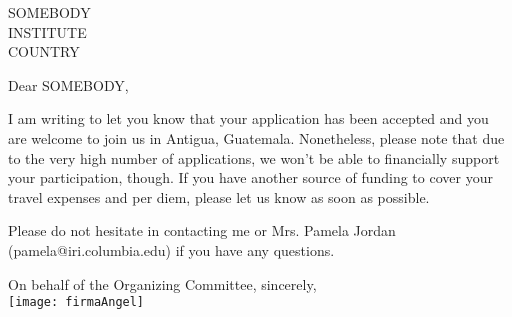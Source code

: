\documentclass[
  fontsize=12pt,
  paper=a4,
   headsepline=false,
  footsepline=true,
  parskip=full, %
  firsthead=true, %
  enlargefirstpage=on,    %
  fromalign=right,        %
  fromphone=off,           %
  fromrule=false, %
  fromemail=true,           %
  addrfield=true,           %
  backaddress=true,         %
  addrfield=true,
  backaddress=false, %
  subject=beforeopening,
  subject=left,
  subject=titled, %
  foldmarks=on,           %
]{scrlttr2}
\begin{document}
  \begin{letter}{{SOMEBODY\\INSTITUTE\\COUNTRY}}
    \opening{Dear SOMEBODY,}
I am writing to let you know that  your application has been accepted and you are welcome to join us in Antigua, Guatemala. Nonetheless, please note that
 due to the very high number of applications, we won't be able to financially support your participation, though. 
    If you have another source of funding to cover your travel expenses and per 
    diem, please let us know as soon as possible. 
    
    Please do not hesitate in contacting me or Mrs. Pamela Jordan (pamela@iri.columbia.edu) if you have any questions.
   

\closing{On behalf of the Organizing Committee, sincerely,\\ \vspace{1cm} {\texttt{[image: firmaAngel]}}}

      \end{letter}
\end{document}
